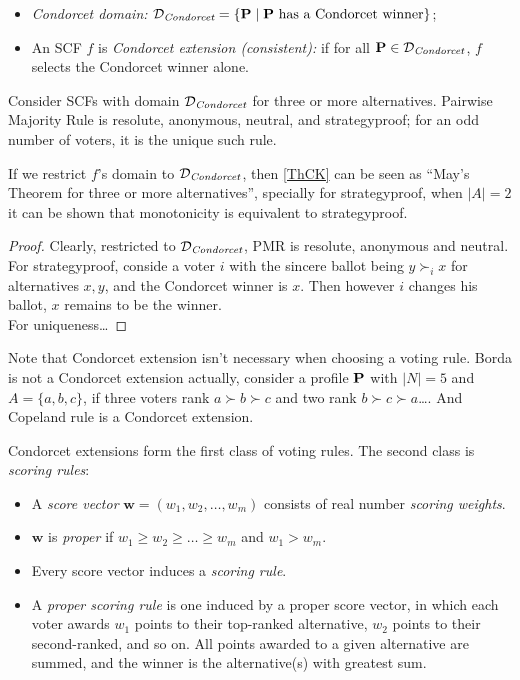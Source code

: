 \begin{definition}
    \begin{itemize}
        \item \textit{Condorcet domain:} $\mathcal{D}_\textit{Condorcet} = \{\mathbf{P}\;|\; \mathbf{P} \mbox{ has a Condorcet winner}\}$;
        \item An SCF $f$ is \textit{Condorcet extension (consistent):} if for all $\mathbf{P} \in \mathcal{D}_\textit{Condorcet}$, $f$ selects the Condorcet winner alone.
    \end{itemize}
\end{definition}

\begin{theorem}
    \label{ThCK}
    Consider SCFs with domain $\mathcal{D}_\textit{Condorcet}$ for three or more alternatives. Pairwise Majority Rule is resolute, anonymous, neutral, and strategyproof; for an odd number of voters, it is the unique such rule.
\end{theorem}

If we restrict $f$'s domain to $\mathcal{D}_\textit{Condorcet}$, then \cref{ThCK} can be seen as “May's Theorem for three or more alternatives”, specially for strategyproof, when $|A| = 2$ it can be shown that monotonicity is equivalent to strategyproof.

\begin{proof}
    Clearly, restricted to $\mathcal{D}_\textit{Condorcet}$, PMR is resolute, anonymous and neutral. For strategyproof, conside a voter $i$ with the sincere ballot being $y \succ_i x$ for alternatives $x,y$, and the Condorcet winner is $x$. Then however $i$ changes his ballot, $x$ remains to be the winner.\\
    For uniqueness\dots
\end{proof}

Note that Condorcet extension isn't necessary when choosing a voting rule. Borda is not a Condorcet extension actually, consider a profile $\mathbf{P}$ with $|N| = 5$ and $A = \{a,b,c\}$, if three voters rank $a \succ b \succ c$ and two rank $b \succ c \succ a$\dots. And Copeland rule is a Condorcet extension.

Condorcet extensions form the first class of voting rules. The second class is \textit{scoring rules}:

\begin{definition}
    \label{scoring_rule}
    \begin{itemize}
        \item A \textit{score vector} $\mathbf{w} = (w_1,w_2,\dots,w_m)$ consists of real number \textit{scoring weights}. 
        \item $\mathbf{w}$ is \textit{proper} if $w_1 \geq w_2 \geq \dots \geq w_m$ and $w_1 > w_m$.
        \item Every score vector induces a \emph{scoring rule}.
        \item A \textit{proper scoring rule} is one induced by a proper score vector, in which each voter awards $w_1$ points to their top-ranked alternative, $w_2$ points to their second-ranked, and so on. All points awarded to a given alternative are summed, and the winner is the alternative(s) with greatest sum.
    \end{itemize}
\end{definition}

